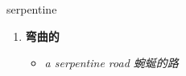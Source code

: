 
\begin{frame}
{\huge serpentine}
\begin{center}
\begin{enumerate}\Large
  \item \textbf{弯曲的}
  \begin{itemize}
    \item \em{\Large{a serpentine road 蜿蜒的路}}
  \end{itemize}
\end{enumerate}
\end{center}
\end{frame}
